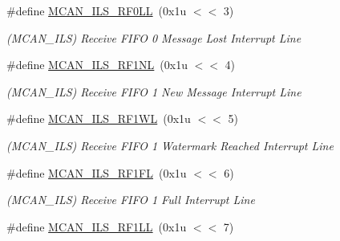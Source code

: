 \begin{DoxyCompactItemize}
\mbox{\label{group__SAME70__MCAN_ga3fd867a29363e15c432d7b6c12a57eac}} 
\#define \mbox{\hyperlink{group__SAME70__MCAN_ga3fd867a29363e15c432d7b6c12a57eac}{M\+C\+A\+N\+\_\+\+I\+L\+S\+\_\+\+R\+F0\+LL}}~(0x1u $<$$<$ 3)
\begin{DoxyCompactList}\small\item\em (M\+C\+A\+N\+\_\+\+I\+LS) Receive F\+I\+FO 0 Message Lost Interrupt Line \end{DoxyCompactList}\item 
\mbox{\label{group__SAME70__MCAN_ga3e906d7bb500002b3e311505ddfaf283}} 
\#define \mbox{\hyperlink{group__SAME70__MCAN_ga3e906d7bb500002b3e311505ddfaf283}{M\+C\+A\+N\+\_\+\+I\+L\+S\+\_\+\+R\+F1\+NL}}~(0x1u $<$$<$ 4)
\begin{DoxyCompactList}\small\item\em (M\+C\+A\+N\+\_\+\+I\+LS) Receive F\+I\+FO 1 New Message Interrupt Line \end{DoxyCompactList}\item 
\mbox{\label{group__SAME70__MCAN_gabcc622b1b392ffe700a4228106ad7ce8}} 
\#define \mbox{\hyperlink{group__SAME70__MCAN_gabcc622b1b392ffe700a4228106ad7ce8}{M\+C\+A\+N\+\_\+\+I\+L\+S\+\_\+\+R\+F1\+WL}}~(0x1u $<$$<$ 5)
\begin{DoxyCompactList}\small\item\em (M\+C\+A\+N\+\_\+\+I\+LS) Receive F\+I\+FO 1 Watermark Reached Interrupt Line \end{DoxyCompactList}\item 
\mbox{\label{group__SAME70__MCAN_ga53cd78808ccd392d7c51804164c5b509}} 
\#define \mbox{\hyperlink{group__SAME70__MCAN_ga53cd78808ccd392d7c51804164c5b509}{M\+C\+A\+N\+\_\+\+I\+L\+S\+\_\+\+R\+F1\+FL}}~(0x1u $<$$<$ 6)
\begin{DoxyCompactList}\small\item\em (M\+C\+A\+N\+\_\+\+I\+LS) Receive F\+I\+FO 1 Full Interrupt Line \end{DoxyCompactList}\item 
\mbox{\label{group__SAME70__MCAN_ga5893ed1d2dec463377fa3a67eec6ab5c}} 
\#define \mbox{\hyperlink{group__SAME70__MCAN_ga5893ed1d2dec463377fa3a67eec6ab5c}{M\+C\+A\+N\+\_\+\+I\+L\+S\+\_\+\+R\+F1\+LL}}~(0x1u $<$$<$ 7)
$$
\end{DoxyCompactItemize}
